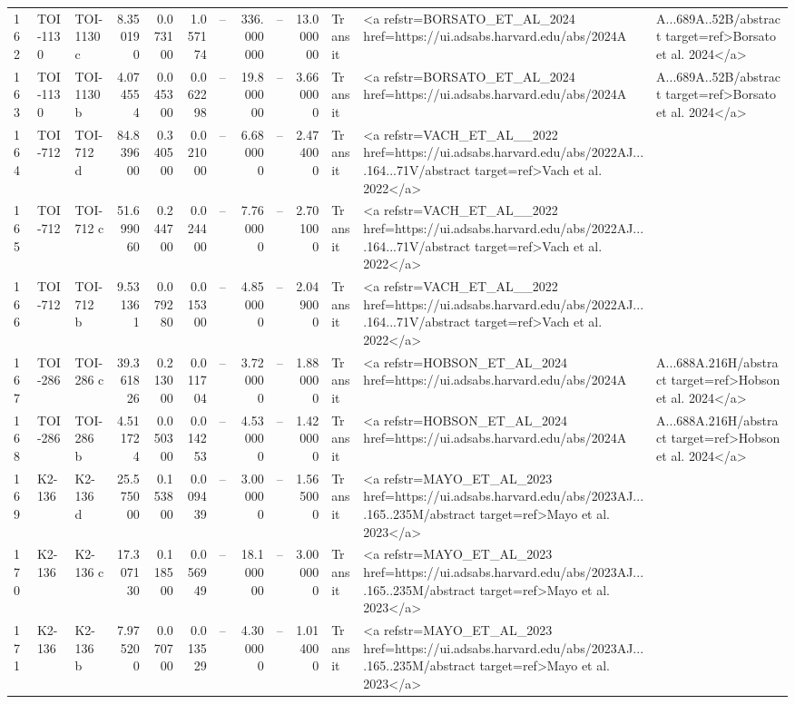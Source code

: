 \begin{tabular}{lllrrrrrrrll}
162 & TOI-1130 & TOI-1130 c & 8.350190 & 0.073100 & 1.057174 & -- & 336.000000 & -- & 13.000000 & Transit & <a refstr=BORSATO_ET_AL_2024 href=https://ui.adsabs.harvard.edu/abs/2024A&A...689A..52B/abstract target=ref>Borsato et al. 2024</a> \\
163 & TOI-1130 & TOI-1130 b & 4.074554 & 0.045300 & 0.062298 & -- & 19.800000 & -- & 3.660000 & Transit & <a refstr=BORSATO_ET_AL_2024 href=https://ui.adsabs.harvard.edu/abs/2024A&A...689A..52B/abstract target=ref>Borsato et al. 2024</a> \\
164 & TOI-712 & TOI-712 d & 84.839600 & 0.340500 & 0.021000 & -- & 6.680000 & -- & 2.474000 & Transit & <a refstr=VACH_ET_AL__2022 href=https://ui.adsabs.harvard.edu/abs/2022AJ....164...71V/abstract target=ref>Vach et al. 2022</a> \\
165 & TOI-712 & TOI-712 c & 51.699060 & 0.244700 & 0.024400 & -- & 7.760000 & -- & 2.701000 & Transit & <a refstr=VACH_ET_AL__2022 href=https://ui.adsabs.harvard.edu/abs/2022AJ....164...71V/abstract target=ref>Vach et al. 2022</a> \\
166 & TOI-712 & TOI-712 b & 9.531361 & 0.079280 & 0.015300 & -- & 4.850000 & -- & 2.049000 & Transit & <a refstr=VACH_ET_AL__2022 href=https://ui.adsabs.harvard.edu/abs/2022AJ....164...71V/abstract target=ref>Vach et al. 2022</a> \\
167 & TOI-286 & TOI-286 c & 39.361826 & 0.213000 & 0.011704 & -- & 3.720000 & -- & 1.880000 & Transit & <a refstr=HOBSON_ET_AL_2024 href=https://ui.adsabs.harvard.edu/abs/2024A&A...688A.216H/abstract target=ref>Hobson et al. 2024</a> \\
168 & TOI-286 & TOI-286 b & 4.511724 & 0.050300 & 0.014253 & -- & 4.530000 & -- & 1.420000 & Transit & <a refstr=HOBSON_ET_AL_2024 href=https://ui.adsabs.harvard.edu/abs/2024A&A...688A.216H/abstract target=ref>Hobson et al. 2024</a> \\
169 & K2-136 & K2-136 d & 25.575000 & 0.153800 & 0.009439 & -- & 3.000000 & -- & 1.565000 & Transit & <a refstr=MAYO_ET_AL_2023 href=https://ui.adsabs.harvard.edu/abs/2023AJ....165..235M/abstract target=ref>Mayo et al. 2023</a> \\
170 & K2-136 & K2-136 c & 17.307130 & 0.118500 & 0.056949 & -- & 18.100000 & -- & 3.000000 & Transit & <a refstr=MAYO_ET_AL_2023 href=https://ui.adsabs.harvard.edu/abs/2023AJ....165..235M/abstract target=ref>Mayo et al. 2023</a> \\
171 & K2-136 & K2-136 b & 7.975200 & 0.070700 & 0.013529 & -- & 4.300000 & -- & 1.014000 & Transit & <a refstr=MAYO_ET_AL_2023 href=https://ui.adsabs.harvard.edu/abs/2023AJ....165..235M/abstract target=ref>Mayo et al. 2023</a> \\

\end{tabular}
